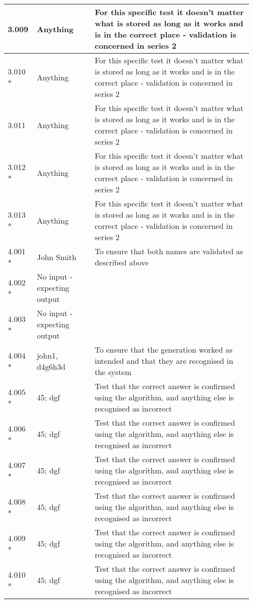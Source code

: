 \begin{landscape}
\begin{center}
\begin{longtable}{|p{4cm}|p{4cm}|p{5cm}|}
3.009 & Anything & For this specific test it doesn't matter what is stored as long as it works and is in the correct place - validation is concerned in series 2 \\ \hline
3.010 * & Anything & For this specific test it doesn't matter what is stored as long as it works and is in the correct place - validation is concerned in series 2 \\ \hline
3.011 & Anything & For this specific test it doesn't matter what is stored as long as it works and is in the correct place - validation is concerned in series 2 \\ \hline
3.012 * & Anything & For this specific test it doesn't matter what is stored as long as it works and is in the correct place - validation is concerned in series 2 \\ \hline
3.013 * & Anything & For this specific test it doesn't matter what is stored as long as it works and is in the correct place - validation is concerned in series 2 \\ \hline
4.001 * & John Smith & To ensure that both names are validated as described above \\ \hline
4.002 * & No input - expecting output & \\ \hline
4.003 * & No input - expecting output & \\ \hline
4.004 * & john1, d4g6h3d & To ensure that the generation worked as intended and that they are recognised in the system \\ \hline
4.005 * & 45; dgf & Test that the correct answer is confirmed using the algorithm, and anything else is recognised as incorrect \\ \hline
4.006 * & 45; dgf & Test that the correct answer is confirmed using the algorithm, and anything else is recognised as incorrect \\ \hline
4.007 * & 45; dgf & Test that the correct answer is confirmed using the algorithm, and anything else is recognised as incorrect \\ \hline
4.008 * & 45; dgf & Test that the correct answer is confirmed using the algorithm, and anything else is recognised as incorrect \\ \hline
4.009 * & 45; dgf & Test that the correct answer is confirmed using the algorithm, and anything else is recognised as incorrect \\ \hline
4.010 * & 45; dgf & Test that the correct answer is confirmed using the algorithm, and anything else is recognised as incorrect \\ \hline

\end{longtable}
\end{center}
\end{landscape}

